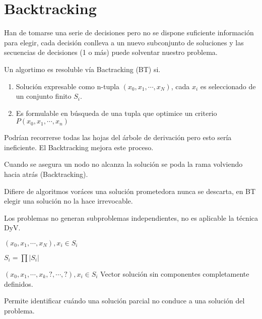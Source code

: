 \chapter{Backtracking}
Han de tomarse una serie de decisiones pero no se dispone suficiente información para elegir, cada decisión conlleva a un nuevo subconjunto de soluciones y las secuencias de decisiones (1 o más) puede solventar nuestro problema.

\begin{theorem}[Caracterización]
	Un algortimo es resoluble vía Bactracking (BT) si.
	\begin{enumerate}
		\item Solución expresable como n-tupla $(x_0, x_1, \cdots,x_N)$, cada $x_i$ es seleccionado de un conjunto finito $S_i$.
		\item Es formulable en búsqueda de una tupla que optimice un criterio $P(x_0, x_1, \cdots,x_n)$
	\end{enumerate}
	Podrían recorrerse todas las hojas del árbole de derivación pero esto sería ineficiente. El Backtracking mejora este proceso.

	Cuando se asegura un nodo no alcanza la solución se poda la rama volviendo hacia atrás (Backtracking).

	Difiere de algoritmos voráces una solución prometedora nunca se descarta, en BT elegir una solución no la hace irrevocable.

	Los problemas no generan subproblemas independientes, no es aplicable la técnica DyV.
\end{theorem}

\begin{definition}[Solución]
	$(x_0, x_1, \cdots,x_N),x_i\in S_i$\end{definition}

\begin{definition}
	$S_i=\prod|S_i|$\end{definition}

\begin{definition}
	$(x_0, x_1, \cdots,x_k,?,\cdots,?),x_i\in S_i$
	Vector solución sin componentes completamente definidos.
\end{definition}

\begin{definition}
	Permite identificar cuándo una solución parcial no conduce a una solución del problema.
\end{definition}

